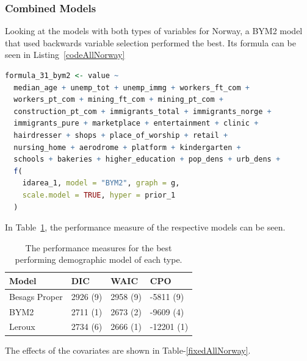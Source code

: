 \subsubsection{Combined Models}
Looking at the models with both types of variables for Norway, a BYM2 model that used backwards variable selection performed the best. Its formula can be seen in Listing~\ref{codeAllNorway}
\begin{lstlisting}[caption={The formula for the best BYM2 model based all variables}, label={codeAllNorway}, language = R]
formula_31_bym2 <- value ~
  median_age + unemp_tot + unemp_immg + workers_ft_com + 
  workers_pt_com + mining_ft_com + mining_pt_com +
  construction_pt_com + immigrants_total + immigrants_norge +
  immigrants_pure + marketplace + entertainment + clinic + 
  hairdresser + shops + place_of_worship + retail + 
  nursing_home + aerodrome + platform + kindergarten + 
  schools + bakeries + higher_education + pop_dens + urb_dens +
  f(
    idarea_1, model = "BYM2", graph = g,
    scale.model = TRUE, hyper = prior_1
  )
\end{lstlisting}
In Table~\ref{allNorway}, the performance measure of the respective models can be seen.
\begin{table}[H] 
\caption{The performance measures for the best performing demographic model of each type. \label{allNorway}}
\begin{tabular}{l l l l}
\toprule
\textbf{Model}	& \textbf{DIC}	& \textbf{WAIC} & \textbf{CPO} \\
\midrule
Besags Proper  & 2926 (9) & 2958 (9) & -5811 (9) \\
BYM2 & 2711 (1) & 2673 (2) & -9609 (4)\\
Leroux & 2734 (6) & 2666 (1) & -12201 (1) \\
\bottomrule
\end{tabular}
\end{table}
The effects of the covariates are shown in Table-\ref{fixedAllNorway}.


